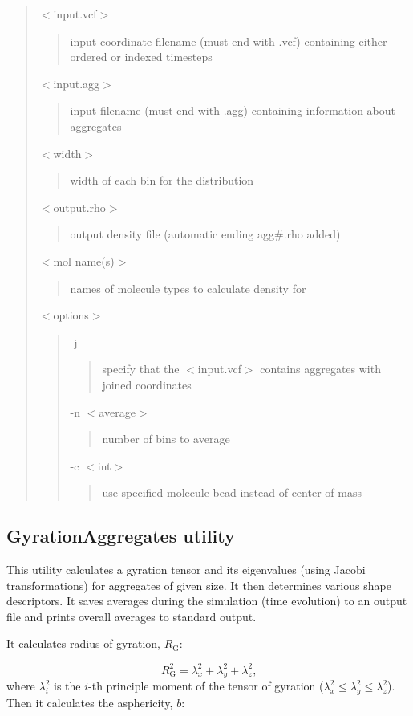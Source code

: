 \begin{quote}
{\ttfamily $<$input.\+vcf$>$} \begin{quote}
input coordinate filename (must end with {\ttfamily .vcf}) containing either ordered or indexed timesteps \end{quote}
{\ttfamily $<$input.\+agg$>$} \begin{quote}
input filename (must end with {\ttfamily .agg}) containing information about aggregates \end{quote}
{\ttfamily $<$width$>$} \begin{quote}
width of each bin for the distribution \end{quote}
{\ttfamily $<$output.\+rho$>$} \begin{quote}
output density file (automatic ending {\ttfamily agg\#.rho} added) \end{quote}
{\ttfamily $<$mol name(s)$>$} \begin{quote}
names of molecule types to calculate density for \end{quote}
{\ttfamily $<$options$>$} \begin{quote}
{\ttfamily -\/j} \begin{quote}
specify that the {\ttfamily $<$input.\+vcf$>$} contains aggregates with joined coordinates \end{quote}
{\ttfamily -\/n $<$average$>$} \begin{quote}
number of bins to average \end{quote}
{\ttfamily -\/c $<$int$>$} \begin{quote}
use specified molecule bead instead of center of mass \end{quote}
\end{quote}
\end{quote}
\hypertarget{Common_GyrationAggregates}{}\subsection{Gyration\+Aggregates utility}\label{Common_GyrationAggregates}
This utility calculates a gyration tensor and its eigenvalues (using Jacobi transformations) for aggregates of given size. It then determines various shape descriptors. It saves averages during the simulation (time evolution) to an output file and prints overall averages to standard output.

It calculates radius of gyration, $R_{\mathrm{G}}$:

\begin{equation}
  R_{\mathrm{G}}^2 = \lambda_x^2 + \lambda_y^2 + \lambda_z^2 \mbox{,}
\end{equation} where $\lambda_i^2$ is the $i$-th principle moment of the tensor
of gyration ($\lambda_x^2 \leq \lambda_y^2 \leq \lambda_z^2$).
Then it calculates the asphericity, $b$:

